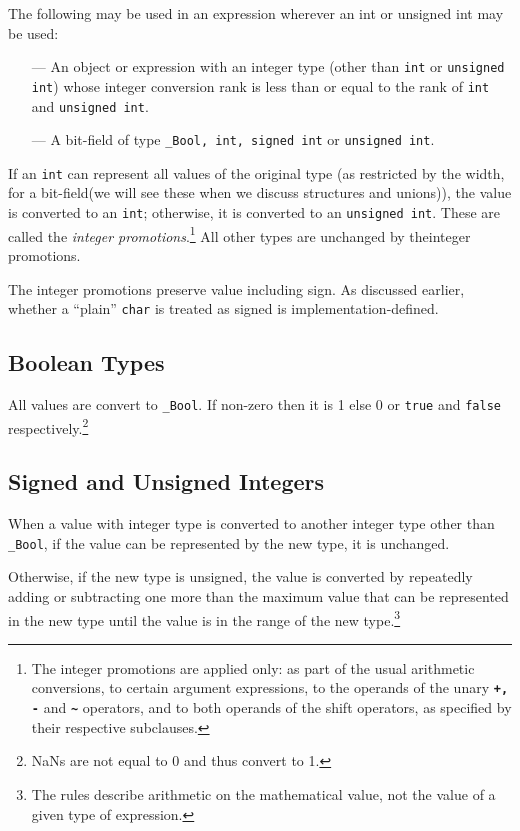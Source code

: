 The following may be used in an expression wherever an int or unsigned int may
be used:

\begin{itemize}
\item[---] An object or expression with an integer type (other than
  \texttt{int} or \texttt{unsigned int}) whose integer conversion rank is less
  than or equal to the rank of \texttt{int} and \texttt{unsigned int}.
\item[---] A bit-field of type \texttt{\_Bool, int, signed int} or \texttt{unsigned int}.
\end{itemize}

If an \texttt{int} can represent all values of the original type (as restricted
by the width, for a bit-field(we will see these when we discuss structures and
unions)), the value is converted to an \texttt{int}; otherwise, it is converted
to an \texttt{unsigned int}. These are called the \textit{integer
  promotions}.\footnote{The integer promotions are applied only: as part of the
  usual arithmetic conversions, to certain argument expressions, to the
  operands of the unary \texttt{\textbf{+, -}} and \texttt{\textbf{\~}}
  operators, and to both operands of the shift operators, as specified by their
  respective subclauses.} All other types are unchanged by theinteger
promotions.

The integer promotions preserve value including sign. As discussed earlier, whether a
``plain'' \texttt{char} is treated as signed is implementation-defined.

\subsection{Boolean Types}
All values are convert to \texttt{\_Bool}. If non-zero then it is 1 else 0 or
\texttt{true} and \texttt{false} respectively.\footnote{NaNs are not equal to 0
  and thus convert to 1.}

\subsection{Signed and Unsigned Integers}
When a value with integer type is converted to another integer type other than
\texttt{\_Bool}, if the value can be represented by the new type, it is
unchanged.

Otherwise, if the new type is unsigned, the value is converted by repeatedly
adding or subtracting one more than the maximum value that can be represented
in the new type until the value is in the range of the new type.\footnote{The
  rules describe arithmetic on the mathematical value, not the value of a given
  type of expression.}

